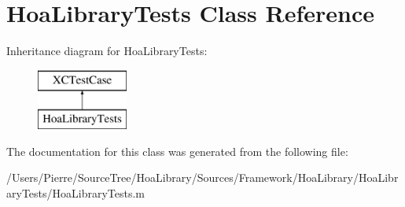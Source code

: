 \hypertarget{interface_hoa_library_tests}{\section{Hoa\-Library\-Tests Class Reference}
\label{interface_hoa_library_tests}
}
Inheritance diagram for Hoa\-Library\-Tests\-:\begin{figure}[H]
\begin{center}
\leavevmode
\includegraphics[height=2.000000cm]{interface_hoa_library_tests}
\end{center}
\end{figure}


The documentation for this class was generated from the following file\-:\begin{DoxyCompactItemize}
\item 
/\-Users/\-Pierre/\-Source\-Tree/\-Hoa\-Library/\-Sources/\-Framework/\-Hoa\-Library/\-Hoa\-Library\-Tests/Hoa\-Library\-Tests.\-m\end{DoxyCompactItemize}
